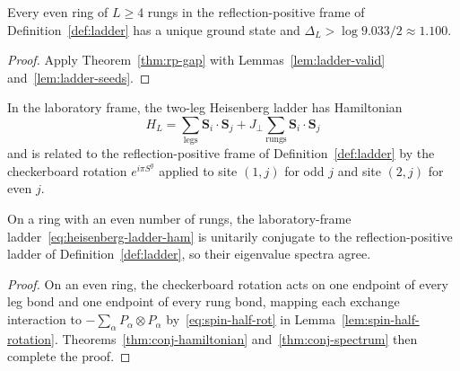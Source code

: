\begin{theorem}
  \label{thm:ladder-gap}
  \leanok
  Every even ring of \(L \ge 4\) rungs in the reflection-positive frame of Definition~\ref{def:ladder}
  has a unique ground state and \(\Delta_L > \log 9.033 / 2 \approx 1.100\).
\end{theorem}
\begin{proof}
  \leanok
  Apply Theorem~\ref{thm:rp-gap} with Lemmas~\ref{lem:ladder-valid} and~\ref{lem:ladder-seeds}.
\end{proof}

\begin{definition}
  \label{def:ladder-physical}
  \leanok
  In the laboratory frame, the two-leg Heisenberg ladder has Hamiltonian
  \begin{equation}
    \label{eq:heisenberg-ladder-ham}
    H_L = \sum_{\text{legs}} \mathbf S_i \cdot \mathbf S_j + J_\perp \sum_{\text{rungs}}
    \mathbf S_i \cdot \mathbf S_j
  \end{equation}
  and is related to the reflection-positive frame of Definition~\ref{def:ladder} by the
  checkerboard rotation \(e^{i\pi S^y}\) applied to site \((1, j)\) for odd \(j\) and site
  \((2, j)\) for even \(j\).
\end{definition}

\begin{lemma}
  \label{lem:ladder-physical-eq}
  \leanok
  On a ring with an even number of rungs, the laboratory-frame ladder~\eqref{eq:heisenberg-ladder-ham}
  is unitarily conjugate to the reflection-positive ladder of Definition~\ref{def:ladder}, so their
  eigenvalue spectra agree.
\end{lemma}
\begin{proof}
  \leanok
  On an even ring, the checkerboard rotation acts on one endpoint of every leg bond and one
  endpoint of every rung bond, mapping each exchange interaction to
  \(-\sum_\alpha P_\alpha \otimes P_\alpha\) by~\eqref{eq:spin-half-rot} in
  Lemma~\ref{lem:spin-half-rotation}. Theorems~\ref{thm:conj-hamiltonian}
  and~\ref{thm:conj-spectrum} then complete the proof.
\end{proof}

